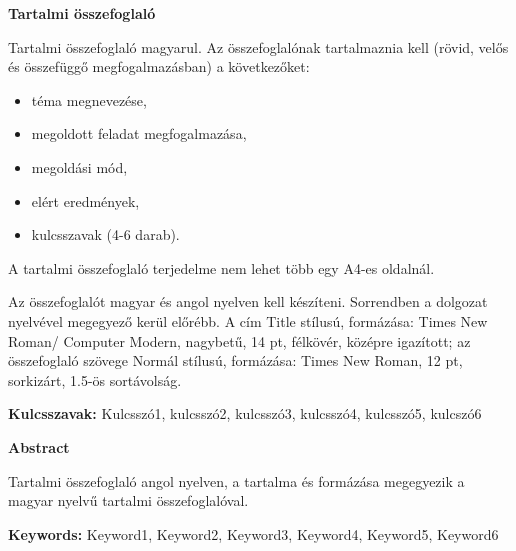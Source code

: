 \textbf{\large{Tartalmi összefoglaló}}\\[32pt]

\thispagestyle{fancy}
\pagestyle{fancy}



\vspace{8pt}

Tartalmi összefoglaló magyarul. Az összefoglalónak tartalmaznia kell (rövid, velős és összefüggő megfogalmazásban) a következőket:
\begin{itemize}
    \item téma megnevezése,
    \item megoldott feladat megfogalmazása,
    \item megoldási mód,
    \item elért eredmények,
    \item kulcsszavak (4-6 darab).
\end{itemize}
A tartalmi összefoglaló terjedelme nem lehet több egy A4-es oldalnál.\par
Az összefoglalót magyar és angol nyelven kell készíteni. Sorrendben a dolgozat nyelvével megegyező kerül előrébb. A cím Title stílusú, formázása: Times New Roman/ Computer Modern, nagybetű, 14 pt, félkövér, középre igazított; az összefoglaló szövege Normál stílusú, formázása: Times New Roman, 12 pt, sorkizárt, 1.5-ös sortávolság.

\vspace{8pt}



\textbf{Kulcsszavak: } Kulcsszó1, kulcsszó2, kulcsszó3, kulcsszó4, kulcsszó5, kulcszó6

\newpage



\textbf{\large{Abstract}}\\[32pt]

\thispagestyle{fancy}
\pagestyle{fancy}

\vspace{8pt}

Tartalmi összefoglaló angol nyelven, a tartalma és formázása megegyezik a magyar nyelvű tartalmi összefoglalóval.

\vspace{8pt}


\textbf{Keywords: } Keyword1, Keyword2, Keyword3, Keyword4, Keyword5, Keyword6 